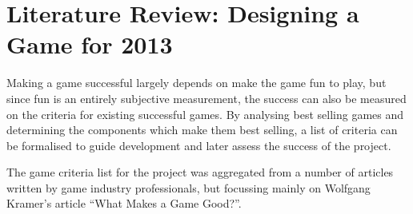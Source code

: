 
\section{Literature Review: Designing a Game for 2013}
\label{sec:litRevDesigningGame}

Making a game successful largely depends on make the game fun to play, but since fun is an entirely subjective measurement, the success can also be measured on the criteria for existing successful games. By analysing best selling games and determining the components which make them best selling, a list of criteria can be formalised to guide development and later assess the success of the project.

The game criteria list for the project was aggregated from a number of articles written by game industry professionals, but focussing mainly on Wolfgang Kramer's article ``What Makes a Game Good?''.



